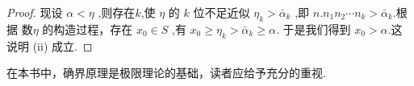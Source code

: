 \begin{proof}
    现设 $\alpha<\eta$ ,则存在$k$,使 $\eta$ 的 $k$ 位不足近似 $\eta_k>\bar \alpha_k$ ,即 $n.n_1n_2\cdots n_k>\bar \alpha_k$.根据 数$\eta$ 的构造过程，存在 $x_0\in S$ ,有 $x_0 \ge \eta_k > \bar \alpha_k \ge \alpha$. 于是我们得到 $x_0>\alpha$.这说明 (ii) 成立.
\end{proof}

在本书中，确界原理是极限理论的基础，读者应给予充分的重视.